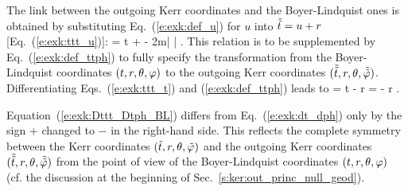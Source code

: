 The link between the outgoing Kerr coordinates and the Boyer-Lindquist ones
is obtained by substituting Eq.~(\ref{e:exk:def_u}) for $u$ into $\tilde{{\tilde t}} = u + r$
[Eq.~(\ref{e:exk:ttt_u})]:
\be \label{e:exk:ttt_t}
    \tilde{\ti} = t +  - 2m\ln\left|  \right| .
\ee
This relation is to be supplemented by Eq.~(\ref{e:exk:def_ttph}) to fully
specify the transformation from the Boyer-Lindquist coordinates
$(t,r,\theta,\varphi)$ to the outgoing Kerr coordinates
$(\tilde{{\tilde t}},r,\theta,\tilde{{\tilde\varphi}})$.
Differentiating Eqs.~(\ref{e:exk:ttt_t}) and (\ref{e:exk:def_ttph})
leads to
\be \label{e:exk:Dttt_Dtph_BL}
    \dd\tilde{\ti} = \dd t -  \dd r
    \qand
    \dd\tilde{\tph} = \dd\ph -  \dd r .
\ee
\begin{remark}
Equation~(\ref{e:exk:Dttt_Dtph_BL}) differs from
Eq.~(\ref{e:exk:dt_dph}) only by the sign $+$ changed to $-$ in the
right-hand side. This reflects the complete symmetry between the Kerr coordinates
$({\tilde t},r,\theta,{\tilde\varphi})$
and the outgoing Kerr coordinates
$(\tilde{{\tilde t}},r,\theta,\tilde{{\tilde\varphi}})$
from the point of view of the Boyer-Lindquist coordinates $(t,r,\theta,\varphi)$
(cf. the discussion at the beginning of Sec.~\ref{s:ker:out_princ_null_geod}).
\end{remark}


